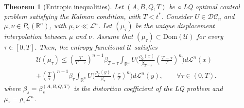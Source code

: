 \documentclass[reqno]{amsart}
\theoremstyle{plain}
\newtheorem{thm}{Theorem}[section]
\theoremstyle{definition}
\theoremstyle{remark}
\begin{document}
		\begin{thm}[Entropic inequalities]\label{dist_displ_interp}
	 	Let $(A,B,Q,T)$ be a LQ optimal control problem satisfying the Kalman condition, with $T<t^*$.
	 	Consider $U\in\mathcal{DC}_n$ and $\mu,\nu\in P_2(\mathbb{R}^n)$, with $\mu,\nu\ll \mathscr{L}^n$. Let $(\mu_\tau)$ be the unique displacement interpolation between $\mu$ and $\nu$. Assume that $(\mu_\tau)\subset\mathrm{Dom}(\mathcal{U})$ for every $\tau\in[0,T]$. Then, the entropy functional $\mathcal{U}$ satisfies
			\begin{multline}
				\mathcal{U}(\mu_\tau)\leq\left(\frac{T}{T-\tau}\right)^{n-1}\beta_{T-\tau}\int_{\mathbb{R}^n}U\bigg(\frac{\rho_0(x)}{\beta_{T-\tau}}\left(\frac{T-\tau}{T}\right)^n\bigg)d\mathscr{L}^n(x)\\
				+\left(\frac{T}{\tau}\right)^{n-1}\beta_{\tau}\int_{\mathbb{R}^n}U\bigg(\frac{\rho_T(y)}{\beta_{\tau}}\left(\frac{\tau}{T}\right)^n\bigg)d\mathscr{L}^n(y),\qquad\forall \tau\in(0,T).
			\end{multline}
            where $\beta_s=\beta_s^{(A,B,Q,T)}$ is the distortion coefficient of the LQ problem and $\mu_\tau=\rho_\tau\mathscr{L}^n$.
		\end{thm}
\end{document}
